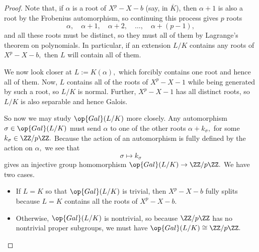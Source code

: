 \begin{proof}
	Note that, if $\alpha$ is a root of $X^p-X-b$ (say, in $\overline K$), then $\alpha+1$ is also a root by the Frobenius automorphism, so continuing this process gives $p$ roots
	\[\alpha,\quad\alpha+1,\quad\alpha+2,\quad\ldots,\quad\alpha+(p-1),\]
	and all these roots must be distinct, so they must all of them by Lagrange's theorem on polynomials. In particular, if an extension $L/K$ contains any roots of $X^p-X-b,$ then $L$ will contain all of them.

	We now look closer at $L:=K(\alpha),$ which forcibly contains one root and hence all of them. Now, $L$ contains all of the roots of $X^p-X-1$ while being generated by such a root, so $L/K$ is normal. Further, $X^p-X-1$ has all distinct roots, so $L/K$ is also separable and hence Galois.

	So now we may study $\op{Gal}(L/K)$ more closely. Any automorphism $\sigma\in\op{Gal}(L/K)$ must send $\alpha$ to one of the other roots $\alpha+k_\sigma,$ for some $k_\sigma\in\ZZ/p\ZZ.$ Because the action of an automorphism is fully defined by the action on $\alpha,$ we see that
	\[\sigma\mapsto k_\sigma\]
	gives an injective group homomorphism $\op{Gal}(L/K)\to\ZZ/p\ZZ.$ We have two cases.
	\begin{itemize}
		\item If $L=K$ so that $\op{Gal}(L/K)$ is trivial, then $X^p-X-b$ fully splits because $L=K$ contains all the roots of $X^p-X-b.$
		\item Otherwise, $\op{Gal}(L/K)$ is nontrivial, so because $\ZZ/p\ZZ$ has no nontrivial proper subgroups, we must have $\op{Gal}(L/K)\cong\ZZ/p\ZZ.$
		\qedhere
	\end{itemize}
\end{proof}

